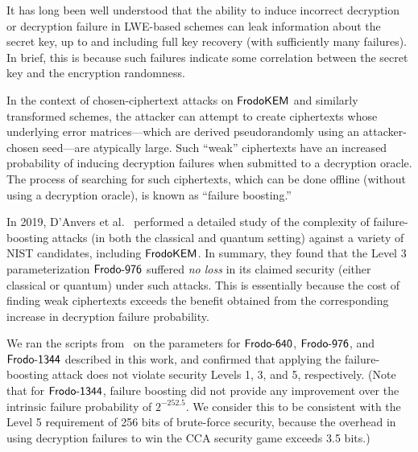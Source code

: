 It has long been well understood that the ability to induce incorrect
decryption or decryption failure in LWE-based schemes can leak
information about the secret key, up to and including full key
recovery (with sufficiently many failures). In brief, this is because
such failures indicate some correlation between the secret key and the
encryption randomness.

In the context of chosen-ciphertext attacks on $\textsf{\upshape\mdseries FrodoKEM}$ and
similarly transformed schemes, the attacker can attempt to create
ciphertexts whose underlying error matrices---which are derived
pseudorandomly using an attacker-chosen seed---are atypically
large. Such ``weak'' ciphertexts have an increased probability of
inducing decryption failures when submitted to a decryption
oracle. The process of searching for such ciphertexts, which can be
done offline (without using a decryption oracle), is known as
``failure boosting.''

In 2019, D'Anvers et al.~\cite{PKC:DGJNVV19} performed a detailed study of
the complexity of failure-boosting attacks (in both the classical and
quantum setting) against a variety of NIST candidates, including
$\textsf{\upshape\mdseries FrodoKEM}$. In summary, they found that the Level 3
parameterization $\textsf{\upshape\mdseries Frodo-976}$ suffered \emph{no loss} in its
claimed security (either classical or quantum) under such
attacks. This is essentially because the cost of finding weak
ciphertexts exceeds the benefit obtained from the corresponding
increase in decryption failure probability.

We ran the scripts from~\cite{PKC:DGJNVV19} on the
parameters for $\textsf{\upshape\mdseries Frodo-640}$, $\textsf{\upshape\mdseries Frodo-976}$, and $\textsf{\upshape\mdseries Frodo-1344}$ described in this work, and
confirmed that applying the failure-boosting attack does not violate security
Levels 1, 3, and 5, respectively. (Note that for $\textsf{\upshape\mdseries Frodo-1344}$,
failure boosting did not provide any improvement over the intrinsic
failure probability of $2^{-252.5}$. We consider this to be consistent
with the Level 5 requirement of 256 bits of brute-force security, because the overhead in using
decryption failures to win the CCA security game exceeds 3.5 bits.)


%
%
%



